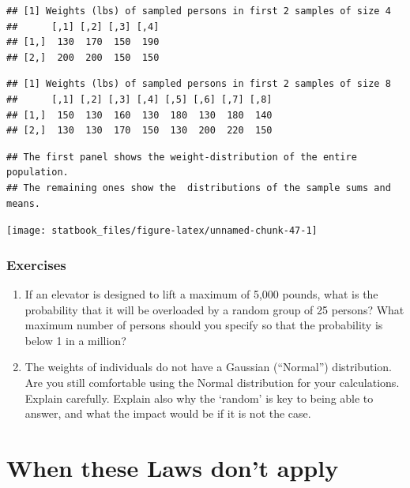 \documentclass[]{book}
\begin{document}
\begin{verbatim}
## [1] Weights (lbs) of sampled persons in first 2 samples of size 4
##      [,1] [,2] [,3] [,4]
## [1,]  130  170  150  190
## [2,]  200  200  150  150
\end{verbatim}

\begin{verbatim}
## [1] Weights (lbs) of sampled persons in first 2 samples of size 8
##      [,1] [,2] [,3] [,4] [,5] [,6] [,7] [,8]
## [1,]  150  130  160  130  180  130  180  140
## [2,]  130  130  170  150  130  200  220  150
\end{verbatim}

\begin{verbatim}
## The first panel shows the weight-distribution of the entire population.
## The remaining ones show the  distributions of the sample sums and means.
\end{verbatim}

\begin{center}\texttt{[image: statbook\_files/figure-latex/unnamed-chunk-47-1]} \end{center}

\hypertarget{exercises-3}{%
\subsubsection{Exercises}\label{exercises-3}}

\begin{enumerate}
\def\labelenumi{\arabic{enumi}.}
\item
  If an elevator is designed to lift a maximum of 5,000 pounds, what is the probability that it will be overloaded by a random group of 25 persons? What maximum number of persons should you specify so that the probability is below 1 in a million?
\item
  The weights of individuals do not have a Gaussian (``Normal'') distribution. Are you still comfortable using the Normal distribution for your calculations. Explain carefully. Explain also why the `random' is key to being able to answer, and what the impact would be if it is not the case.
\end{enumerate}

\hypertarget{when-these-laws-dont-apply}{%
\section{When these Laws don't apply}\label{when-these-laws-dont-apply}}
\end{document}
